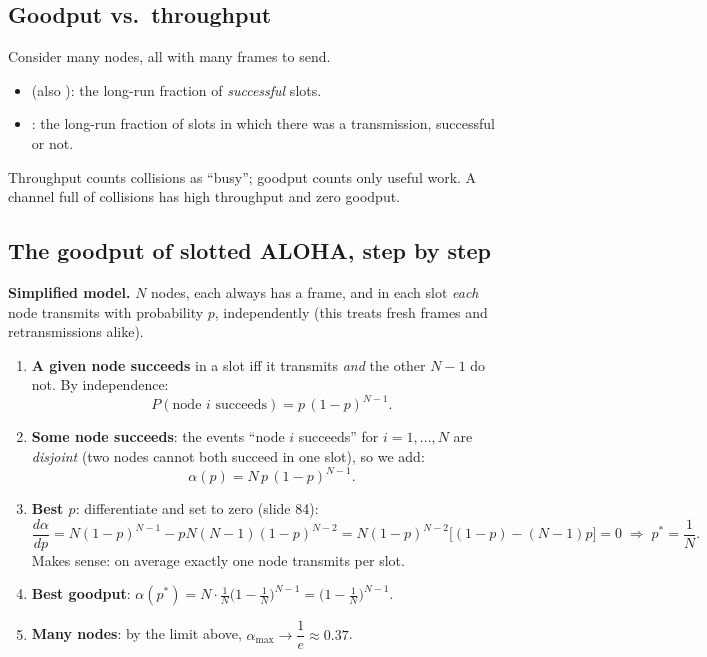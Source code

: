 \subsection{Goodput vs.\ throughput}

\begin{defn}
Consider many nodes, all with many frames to send.
\begin{itemize}
  \item {} (also ): the long-run fraction of \emph{successful} slots.
  \item {}: the long-run fraction of slots in which there was a transmission, successful or not.
\end{itemize}
Throughput counts collisions as ``busy''; goodput counts only useful work. A channel full of collisions has high throughput and zero goodput.
\end{defn}

\subsection{The goodput of slotted ALOHA, step by step}

\textbf{Simplified model.} $N$ nodes, each always has a frame, and in each slot \emph{each} node transmits with probability $p$, independently
(this treats fresh frames and retransmissions alike).

\begin{enumerate}
  \item \textbf{A given node succeeds} in a slot iff it transmits \emph{and} the other $N-1$ do not. By independence:
        \[ P(\text{node $i$ succeeds})=p\,(1-p)^{N-1}. \]
  \item \textbf{Some node succeeds}: the events ``node $i$ succeeds'' for $i=1,\dots,N$ are \emph{disjoint} (two nodes cannot both succeed in one slot), so we add:
        \[ \alpha(p)=N\,p\,(1-p)^{N-1}. \]
  \item \textbf{Best $p$}: differentiate and set to zero (slide 84):
        \[ \frac{d\alpha}{dp}=N(1-p)^{N-1}-pN(N-1)(1-p)^{N-2}=N(1-p)^{N-2}\big[(1-p)-(N-1)p\big]=0 \;\Rightarrow\; p^*=\frac1N. \]
        Makes sense: on average exactly one node transmits per slot.
  \item \textbf{Best goodput}: $\alpha(p^*)=N\cdot\frac1N\big(1-\frac1N\big)^{N-1}=\big(1-\frac1N\big)^{N-1}$.
  \item \textbf{Many nodes}: by the limit above, $\alpha_{\max}\to\dfrac1e\approx0.37$.
\end{enumerate}

